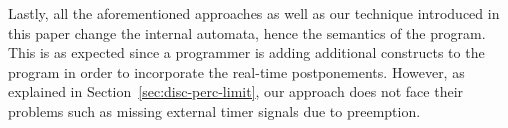 Lastly, all the aforementioned approaches
\cite{rsh94,Bourke2009a,glog02} as well as our technique introduced in
this paper cha\-nge the internal automata, hence the semantics of the
program. This is as expected since a programmer is adding additional
constructs to the program in order to incorporate the real-time
postponements. However, as explained in
Section~\ref{sec:disc-perc-limit}, our approach does not face their
problems such as missing external timer signals due to preemption.









